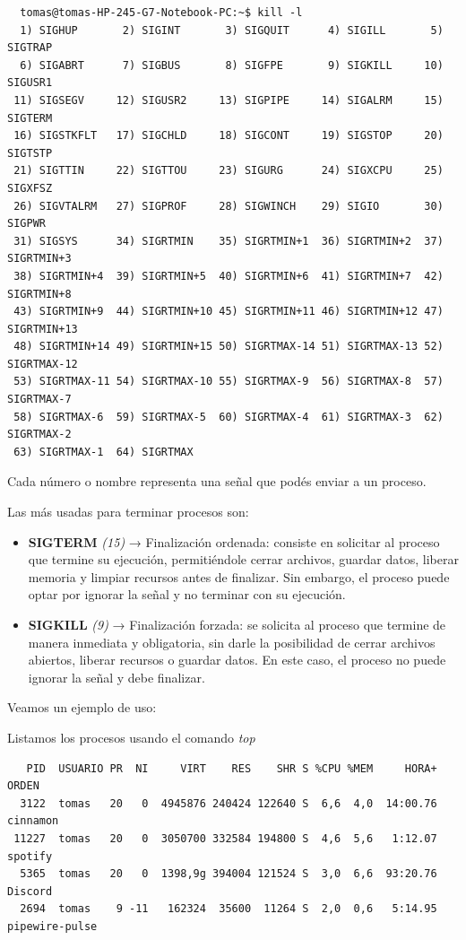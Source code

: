 \documentclass{article}
\begin{document}
\begin{commandline}
 {
\begin{verbatim}
  tomas@tomas-HP-245-G7-Notebook-PC:~$ kill -l
  1) SIGHUP       2) SIGINT       3) SIGQUIT      4) SIGILL       5) SIGTRAP 
  6) SIGABRT      7) SIGBUS       8) SIGFPE       9) SIGKILL     10) SIGUSR1
 11) SIGSEGV     12) SIGUSR2     13) SIGPIPE     14) SIGALRM     15) SIGTERM
 16) SIGSTKFLT   17) SIGCHLD     18) SIGCONT     19) SIGSTOP     20) SIGTSTP
 21) SIGTTIN     22) SIGTTOU     23) SIGURG      24) SIGXCPU     25) SIGXFSZ
 26) SIGVTALRM   27) SIGPROF     28) SIGWINCH    29) SIGIO       30) SIGPWR   
 31) SIGSYS      34) SIGRTMIN    35) SIGRTMIN+1  36) SIGRTMIN+2  37) SIGRTMIN+3 
 38) SIGRTMIN+4  39) SIGRTMIN+5  40) SIGRTMIN+6  41) SIGRTMIN+7  42) SIGRTMIN+8 
 43) SIGRTMIN+9  44) SIGRTMIN+10 45) SIGRTMIN+11 46) SIGRTMIN+12 47) SIGRTMIN+13 
 48) SIGRTMIN+14 49) SIGRTMIN+15 50) SIGRTMAX-14 51) SIGRTMAX-13 52) SIGRTMAX-12 
 53) SIGRTMAX-11 54) SIGRTMAX-10 55) SIGRTMAX-9  56) SIGRTMAX-8  57) SIGRTMAX-7 
 58) SIGRTMAX-6  59) SIGRTMAX-5  60) SIGRTMAX-4  61) SIGRTMAX-3  62) SIGRTMAX-2 
 63) SIGRTMAX-1  64) SIGRTMAX
\end{verbatim}
}
\end{commandline}

\noindent
Cada número o nombre representa una señal que podés enviar a un proceso.

\medbreak\noindent
Las más usadas para terminar procesos son:

\begin{itemize}
  \item \textbf{SIGTERM} \textit{(15)} → Finalización ordenada: consiste en solicitar al proceso que termine su ejecución, 
  permitiéndole cerrar archivos, guardar datos, liberar memoria y limpiar recursos antes de finalizar. Sin embargo, el proceso 
  puede optar por ignorar la señal y no terminar con su ejecución.
  \item \textbf{SIGKILL} \textit{(9)} → Finalización forzada: se solicita al proceso que termine de manera inmediata y obligatoria,
  sin darle la posibilidad de cerrar archivos abiertos, liberar recursos o guardar datos. En este caso, el proceso no puede 
  ignorar la señal y debe finalizar.
\end{itemize}

\noindent
Veamos un ejemplo de uso:

\bigbreak\noindent
Listamos los procesos usando el comando \textit{top}
   
\begin{commandline}
 {
\begin{verbatim}
   PID  USUARIO PR  NI     VIRT    RES    SHR S %CPU %MEM     HORA+ ORDEN
  3122  tomas   20   0  4945876 240424 122640 S  6,6  4,0  14:00.76 cinnamon
 11227  tomas   20   0  3050700 332584 194800 S  4,6  5,6   1:12.07 spotify
  5365  tomas   20   0  1398,9g 394004 121524 S  3,0  6,6  93:20.76 Discord
  2694  tomas    9 -11   162324  35600  11264 S  2,0  0,6   5:14.95 pipewire-pulse
\end{verbatim}
}
\end{commandline}
\end{document}
